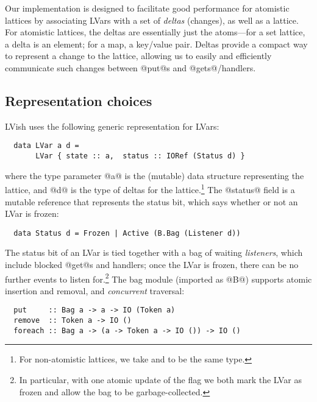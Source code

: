 Our implementation is designed to facilitate good performance for
atomistic lattices by associating LVars with a set of \emph{deltas}
(changes), as well as a lattice.  For atomistic lattices, the deltas
are essentially just the atoms---for a set lattice, a delta is an
element; for a map, a key/value pair.  Deltas provide a compact way to
represent a change to the lattice, allowing us to easily and
efficiently communicate such changes between @put@s and
@gets@/handlers.


\subsection{Representation choices}

LVish uses the following generic representation for LVars:

\singlespacing
\begin{lstlisting}
  data LVar a d = 
       LVar { state :: a,  status :: IORef (Status d) }
\end{lstlisting}
\doublespacing

where the type parameter @a@ is the (mutable) data structure
representing the lattice, and @d@ is the type of deltas for the
lattice.\footnote{For non-atomistic lattices, we take  and
   to be the same type.}  The @status@ field is a mutable
reference that represents the status bit, which says whether or not an
LVar is frozen:

\singlespacing
\begin{lstlisting}
  data Status d = Frozen | Active (B.Bag (Listener d))
\end{lstlisting}
\doublespacing

The status bit of an LVar is tied together with a bag of waiting
\emph{listeners}, which include blocked @get@s and handlers; once the
LVar is frozen, there can be no further events to listen
for.\footnote{In particular, with one atomic update of the flag we
  both mark the LVar as frozen and allow the bag to be
  garbage-collected.}  The bag module (imported as @B@) supports
atomic insertion and removal, and \emph{concurrent} traversal:

\singlespacing
\begin{lstlisting}
  put     :: Bag a -> a -> IO (Token a)
  remove  :: Token a -> IO ()
  foreach :: Bag a -> (a -> Token a -> IO ()) -> IO ()
\end{lstlisting}
\doublespacing

